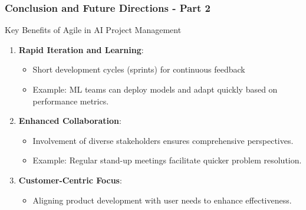 \documentclass{beamer}
\begin{document}
\begin{frame}[fragile]
    \frametitle{Conclusion and Future Directions - Part 2}
    \begin{block}{Key Benefits of Agile in AI Project Management}
        \begin{enumerate}
            \item \textbf{Rapid Iteration and Learning}:
                \begin{itemize}
                    \item Short development cycles (sprints) for continuous feedback
                    \item Example: ML teams can deploy models and adapt quickly based on performance metrics.
                \end{itemize}
            \item \textbf{Enhanced Collaboration}:
                \begin{itemize}
                    \item Involvement of diverse stakeholders ensures comprehensive perspectives.
                    \item Example: Regular stand-up meetings facilitate quicker problem resolution.
                \end{itemize}
            \item \textbf{Customer-Centric Focus}:
                \begin{itemize}
                    \item Aligning product development with user needs to enhance effectiveness.
                \end{itemize}
        \end{enumerate}
    \end{block}
\end{frame}
\end{document}
